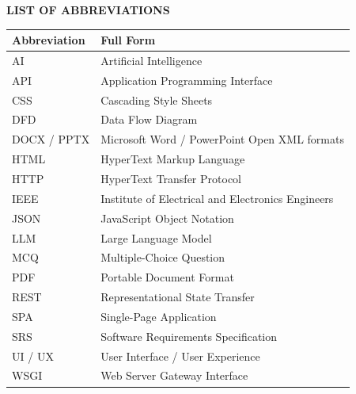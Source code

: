 \documentclass[12pt, a4paper]{report}
\begin{document}
\newpage
{}
{}
\begin{center}
{\LARGE \textbf{LIST OF ABBREVIATIONS}}\\[1cm]
\end{center}
\begin{tabularx}{\textwidth}{@{} p{3cm} X @{}}
\toprule
\textbf{Abbreviation} & \textbf{Full Form} \\
\midrule
AI & Artificial Intelligence \\
API & Application Programming Interface \\
CSS & Cascading Style Sheets \\
DFD & Data Flow Diagram \\
DOCX / PPTX & Microsoft Word / PowerPoint Open XML formats \\
HTML & HyperText Markup Language \\
HTTP & HyperText Transfer Protocol \\
IEEE & Institute of Electrical and Electronics Engineers \\
JSON & JavaScript Object Notation \\
LLM & Large Language Model \\
MCQ & Multiple-Choice Question \\
PDF & Portable Document Format \\
REST & Representational State Transfer \\
SPA & Single-Page Application \\
SRS & Software Requirements Specification \\
UI / UX & User Interface / User Experience \\
WSGI & Web Server Gateway Interface \\
\bottomrule
\end{tabularx}

\newpage
{}















\appendix


\end{document}
